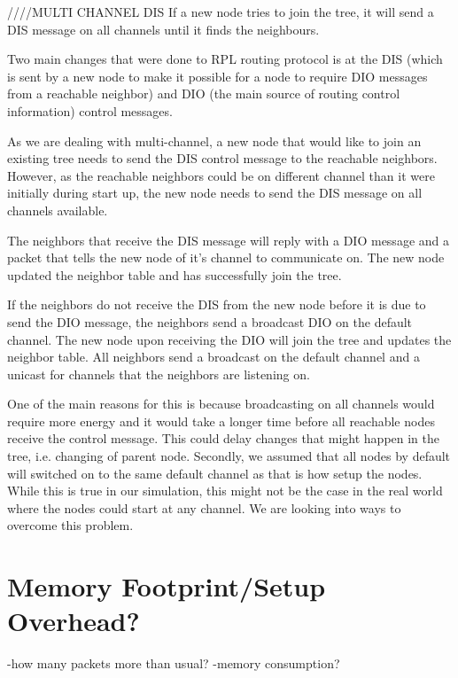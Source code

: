 ////MULTI CHANNEL DIS
If a new node tries to join the tree, it will send a DIS message on all channels until it finds the neighbours. 

Two main changes that were done to RPL routing protocol is at the DIS (which is sent by a new node to make it possible for a node to require DIO messages from a reachable neighbor) and DIO (the main source of routing control information) control messages.

As we are dealing with multi-channel, a new node that would like to join an existing tree needs to send the DIS control message to the reachable neighbors. However, as the reachable neighbors could be on different channel than it were initially during start up, the new node needs to send the DIS message on all channels available. 

The neighbors that receive the DIS message will reply with a DIO message and a packet that tells the new node of it's channel to communicate on. The new node updated the neighbor table and has successfully join the tree. 

If the neighbors do not receive the DIS from the new node before it is due to send the DIO message, the neighbors send a broadcast DIO on the default channel. The new node upon receiving the DIO will join the tree and updates the neighbor table. All neighbors send a broadcast on the default channel and a unicast for channels that the neighbors are listening on. 

One of the main reasons for this is because broadcasting on all channels would require more energy and it would take a longer time before all reachable nodes receive the control message. This could delay changes that might happen in the tree, i.e. changing of parent node. Secondly, we assumed that all nodes by default will switched on to the same default channel as that is how setup the nodes. While this is true in our simulation, this might not be the case in the real world where the nodes could start at any channel. We are looking into ways to overcome this problem.

\section{Memory Footprint/Setup Overhead?}
-how many packets more than usual?
-memory consumption?